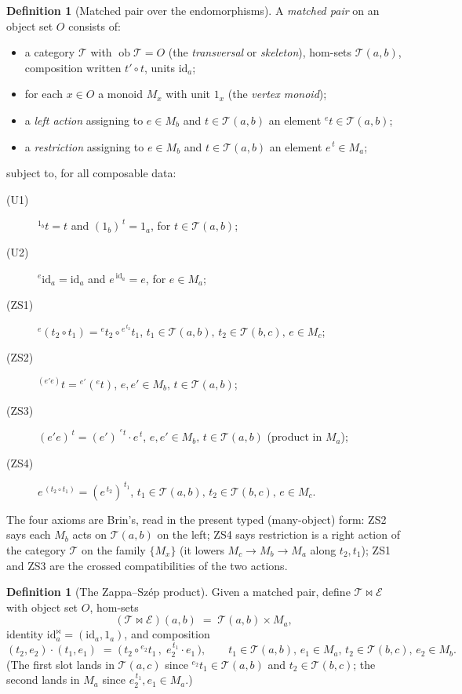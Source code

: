 \documentclass[11pt]{article}
\theoremstyle{definition}
\newtheorem{definition}[theorem]{Definition}
\newcommand{\id}{\mathrm{id}}
\newcommand{\T}{\mathcal{T}}
\newcommand{\E}{\mathcal{E}}
\newcommand{\ob}{\operatorname{ob}}
\newcommand{\lact}[2]{{}^{#1}\!#2}      %
\newcommand{\rest}[2]{#1^{\,#2}}        %
\begin{document}
\begin{definition}[Matched pair over the endomorphisms]\label{def:matched}
A \emph{matched pair} on an object set $O$ consists of:
\begin{itemize}
\item a category $\T$ with $\ob\T=O$ (the \emph{transversal} or \emph{skeleton}),
hom-sets $\T(a,b)$, composition written $t'\circ t$, units $\id_a$;
\item for each $x\in O$ a monoid $M_x$ with unit $1_x$ (the \emph{vertex monoid});
\item a \emph{left action} assigning to $e\in M_b$ and $t\in\T(a,b)$ an element
$\lact{e}{t}\in\T(a,b)$;
\item a \emph{restriction} assigning to $e\in M_b$ and $t\in\T(a,b)$ an element
$\rest{e}{t}\in M_a$;
\end{itemize}
subject to, for all composable data:
\begin{description}
\item[(U1)] $\lact{1_b}{t}=t$ and $\rest{(1_b)}{t}=1_a$, for $t\in\T(a,b)$;
\item[(U2)] $\lact{e}{\id_a}=\id_a$ and $\rest{e}{\id_a}=e$, for $e\in M_a$;
\item[(ZS1)] $\lact{e}{(t_2\circ t_1)}=\lact{e}{t_2}\circ\lact{\rest{e}{t_2}}{t_1}$,\quad
$t_1\in\T(a,b),\,t_2\in\T(b,c),\,e\in M_c$;
\item[(ZS2)] $\lact{(e'e)}{t}=\lact{e'}{(\lact{e}{t})}$,\quad
$e,e'\in M_b,\,t\in\T(a,b)$;
\item[(ZS3)] $\rest{(e'e)}{t}=\rest{(e')}{\,\lact{e}{t}}\cdot\rest{e}{t}$,\quad
$e,e'\in M_b,\,t\in\T(a,b)$ \;(product in $M_a$);
\item[(ZS4)] $\rest{e}{(t_2\circ t_1)}=\rest{(\rest{e}{t_2})}{t_1}$,\quad
$t_1\in\T(a,b),\,t_2\in\T(b,c),\,e\in M_c$.
\end{description}
\end{definition}

The four axioms are Brin's, read in the present typed (many-object) form: ZS2
says each $M_b$ acts on $\T(a,b)$ on the left; ZS4 says restriction is a right
action of the category $\T$ on the family $\{M_x\}$ (it lowers $M_c\to M_b\to M_a$
along $t_2,t_1$); ZS1 and ZS3 are the crossed compatibilities of the two actions.

\begin{definition}[The Zappa--Sz\'ep product]\label{def:product}
Given a matched pair, define $\T\bowtie\E$ with object set $O$, hom-sets
\[
  (\T\bowtie\E)(a,b)\;=\;\T(a,b)\times M_a,
\]
identity $\id^{\bowtie}_a=(\id_a,1_a)$, and composition
\[
  (t_2,e_2)\cdot(t_1,e_1)\;=\;\bigl(\,t_2\circ\lact{e_2}{t_1}\,,\;
  \rest{e_2}{t_1}\cdot e_1\,\bigr),
  \qquad t_1\in\T(a,b),\,e_1\in M_a,\,t_2\in\T(b,c),\,e_2\in M_b .
\]
(The first slot lands in $\T(a,c)$ since $\lact{e_2}{t_1}\in\T(a,b)$ and
$t_2\in\T(b,c)$; the second lands in $M_a$ since $\rest{e_2}{t_1},e_1\in M_a$.)
\end{definition}
\end{document}
